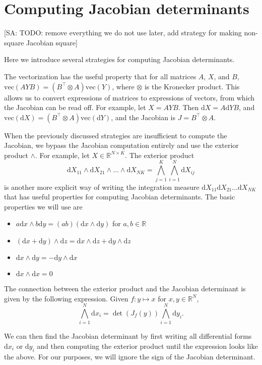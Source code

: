\documentclass[11pt]{article}
\newcommand{\dv}[1]{\mathrm{d}{#1}}
\newcommand{\vect}{\mathrm{vec}}
\begin{document}
\section{Computing Jacobian determinants}

[SA: TODO: remove everything we do not use later, add strategy for making non-square Jacobian square]

Here we introduce several strategies for computing Jacobian determinants.

The vectorization has the useful property that for all matrices $A$, $X$, and $B$, $\vect(AYB) = (B^\top \otimes A) \vect(Y)$, where $\otimes$ is the Kronecker product.
This allows us to convert expressions of matrices to expressions of vectors, from which the Jacobian can be read off.
For example, let $X = AYB$. Then $\dv{X} = A \dv{Y} B$, and $\vect(\dv{X}) = (B^\top \otimes A) \vect(\dv{Y})$, and the Jacobian is $J = B^\top \otimes A$.

When the previously discussed strategies are insufficient to compute the Jacobian, we bypass the Jacobian computation entirely and use the exterior product $\wedge$.
For example, let $X \in \mathbb{R}^{N \times K}$.
The exterior product
\[
  \dv{X_{11} }\wedge \dv{X_{21}} \wedge \ldots \wedge \dv{X_{NK}} = \bigwedge_{j=1}^K \bigwedge_{i=1}^N \dv{X}_{ij}
\]
is another more explicit way of writing the integration measure $\dv{X_{11}} \dv{X_{21}} \dots \dv{X_{NK}}$ that has useful properties for computing Jacobian determinants.
The basic properties we will use are

\begin{itemize}
  \item $a\dv{x} \wedge b\dv{y} = (ab)(\dv{x} \wedge \dv{y})$ for $a,b \in \mathbb{R}$
  \item $(\dv{x} + \dv{y}) \wedge \dv{z} = \dv{x} \wedge \dv{z} + \dv{y} \wedge \dv{z}$
  \item $\dv{x} \wedge \dv{y} = - \dv{y} \wedge \dv{x}$
  \item $\dv{x} \wedge \dv{x} = 0$
\end{itemize}

The connection between the exterior product and the Jacobian determinant is given by the following expression.
Given $f: y \mapsto x$ for $x,y \in \mathbb{R}^N$,
\[\bigwedge_{i=1}^N \dv{x_i} = \det(J_f(y)) \bigwedge_{i=1}^N \dv{y_i}.\]

We can then find the Jacobian determinant by first writing all differential forms $\dv{x_i}$ or $\dv{y_i}$ and then computing the exterior product until the expression looks like the above.
For our purposes, we will ignore the sign of the Jacobian determinant.
\end{document}

